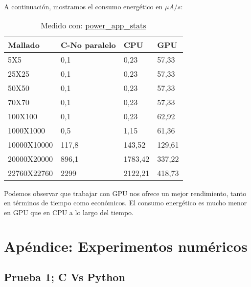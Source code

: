 \begin{ejemplo}
  \newpage
  A continuación, mostramos el consumo energético en $\mu A / s$:
  
  \begin{table}[h]
    \centering
    \begin{tabular}{@{}llll@{}}
      \toprule
      Mallado     & C-No paralelo & CPU     & GPU    \\ \midrule
      5X5         & 0,1           & 0,23    & 57,33  \\
      25X25       & 0,1           & 0,23    & 57,33  \\
      50X50       & 0,1           & 0,23    & 57,33  \\
      70X70       & 0,1           & 0,23    & 57,33  \\
      100X100     & 0,1           & 0,23    & 62,92  \\
      1000X1000   & 0,5           & 1,15    & 61,36  \\
      10000X10000 & 117,8         & 143,52  & 129,61 \\
      20000X20000 & 896,1         & 1783,42 & 337,22 \\
      22760X22760 & 2299          & 2122,21 & 418,73 \\ \bottomrule
    \end{tabular}
    
    \caption{Medido con:  \href{https://github.com/JoseCarlosGarcia95/power_app_stats}{power\_app\_stats}}
  \end{table}

  Podemos observar que trabajar con GPU nos ofrece un mejor rendimiento, tanto en términos de tiempo como económicos. El consumo energético es mucho menor en GPU que en CPU a lo largo del tiempo.
\end{ejemplo}


\iffalse
\section{Apéndice: Experimentos numéricos}

\subsection{Prueba 1; C Vs Python}
\label{prueba:cvspython}

